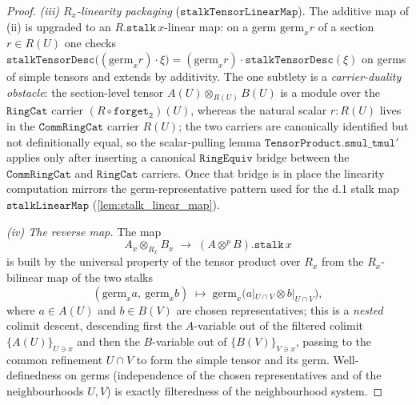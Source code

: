 \begin{proof}
  \emph{(iii) \(R_x\)-linearity packaging} (\(\mathtt{stalkTensorLinearMap}\)). The
  additive map of (ii) is upgraded to an \(R.\mathtt{stalk}\,x\)-linear map: on a germ
  \(\mathrm{germ}_x r\) of a section \(r \in R(U)\) one checks
  \(\mathtt{stalkTensorDesc}\bigl((\mathrm{germ}_x r)\cdot \xi\bigr) =
  (\mathrm{germ}_x r)\cdot \mathtt{stalkTensorDesc}(\xi)\) on germs of simple tensors
  and extends by additivity. The one subtlety is a \emph{carrier-duality obstacle}:
  the section-level tensor \(A(U) \otimes_{R(U)} B(U)\) is a module over the
  \(\mathtt{RingCat}\) carrier \((R \circ \mathtt{forget_2})(U)\), whereas the natural
  scalar \(r : R(U)\) lives in the \(\mathtt{CommRingCat}\) carrier \(R(U)\); the two
  carriers are canonically identified but not definitionally equal, so the
  scalar-pulling lemma \(\mathtt{TensorProduct.smul\_tmul'}\) applies only after
  inserting a canonical \(\mathtt{RingEquiv}\) bridge between the
  \(\mathtt{CommRingCat}\) and \(\mathtt{RingCat}\) carriers. Once that bridge is
  in place the linearity computation mirrors the germ-representative pattern used
  for the d.1 stalk map \(\mathtt{stalkLinearMap}\) (\cref{lem:stalk_linear_map}).

  \emph{(iv) The reverse map.} The map
  \[
    A_x \otimes_{R_x} B_x \;\longrightarrow\; (A \otimes^{p} B).\mathtt{stalk}\,x
  \]
  is built by the universal property of the tensor product over \(R_x\) from the
  \(R_x\)-bilinear map of the two stalks
  \[
    (\mathrm{germ}_x a,\ \mathrm{germ}_x b) \;\longmapsto\;
      \mathrm{germ}_x\bigl(a|_{U \cap V} \otimes b|_{U \cap V}\bigr),
  \]
  where \(a \in A(U)\) and \(b \in B(V)\) are chosen representatives; this is a
  \emph{nested} colimit descent, descending first the \(A\)-variable out of the
  filtered colimit \(\{A(U)\}_{U \ni x}\) and then the \(B\)-variable out of
  \(\{B(V)\}_{V \ni x}\), passing to the common refinement \(U \cap V\) to form the
  simple tensor and its germ. Well-definedness on germs (independence of the chosen
  representatives and of the neighbourhoods \(U, V\)) is exactly filteredness of the
  neighbourhood system.


\end{proof}
